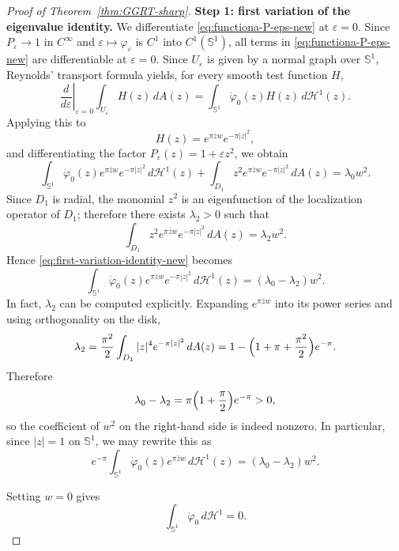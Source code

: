 \documentclass[a4paper,11pt,reqno]{amsart}
\numberwithin{equation}{section}
\theoremstyle{plain} %
\theoremstyle{definition} %
\theoremstyle{remark}
\begin{document}
\begin{proof}[Proof of Theorem~\ref{thm:GGRT-sharp}]
\medskip
\noindent
{\bf Step 1: first variation of the eigenvalue identity.} We differentiate \eqref{eq:functiona-P-eps-new} at $\varepsilon=0$.
Since \(P_\varepsilon\to 1\) in \(C^\infty\) and
\(\varepsilon\mapsto \varphi_\varepsilon\) is \(C^1\) into \(C^1(\mathbb S^1)\),
all terms in \eqref{eq:functiona-P-eps-new} are differentiable at
\(\varepsilon=0\). Since $U_\varepsilon$ is given by a normal graph over $\mathbb S^1$, Reynolds'
transport formula yields, for every smooth test function $H$,
\[
\left.\frac{d}{d\varepsilon}\right|_{\varepsilon=0}
\int_{U_\varepsilon} H(z)\,dA(z)
=
\int_{\mathbb S^1} \dot\varphi_0(z)H(z)\,d\mathcal H^1(z).
\]
Applying this to
\[
H(z)=e^{\pi \overline zw}e^{-\pi|z|^2},
\]
and differentiating the factor $P_\varepsilon(z)=1+\varepsilon z^2$, we obtain
\begin{equation}\label{eq:first-variation-identity-new}
\int_{\mathbb S^1}
\dot\varphi_0(z)e^{\pi \overline zw}e^{-\pi|z|^2}\,d\mathcal H^1(z)
+
\int_{D_1} z^2 e^{\pi \overline zw}e^{-\pi|z|^2}\,dA(z)
=
\lambda_0 w^2.
\end{equation}
Since $D_1$ is radial, the monomial $z^2$ is an eigenfunction of the
localization operator of $D_1$; therefore there exists $\lambda_2>0$ such that
\[
\int_{D_1} z^2 e^{\pi \overline zw}e^{-\pi|z|^2}\,dA(z)=\lambda_2 w^2.
\]
Hence \eqref{eq:first-variation-identity-new} becomes
\begin{equation}\label{eq:boundary-identity-new}
\int_{\mathbb S^1}
\dot\varphi_0(z)e^{\pi \overline zw}e^{-\pi|z|^2}\,d\mathcal H^1(z)
=
(\lambda_0-\lambda_2)w^2.
\end{equation}
In fact, \(\lambda_2\) can be computed explicitly. Expanding
\(e^{\pi \overline zw}\) into its power series and using orthogonality on the
disk,
\[
\lambda_2
=
\frac{\pi^2}{2}\int_{D_1}|z|^4e^{-\pi|z|^2}\,dA(z)
=
1-\Bigl(1+\pi+\frac{\pi^2}{2}\Bigr)e^{-\pi}.
\]
Therefore
\[
\lambda_0-\lambda_2
=
\pi\Bigl(1+\frac{\pi}{2}\Bigr)e^{-\pi}>0,
\]
so the coefficient of \(w^2\) on the right-hand side is indeed nonzero.
In particular, since $|z|=1$ on $\mathbb S^1$, we may rewrite this as
\begin{equation}\label{eq:boundary-identity-circle-new}
e^{-\pi}
\int_{\mathbb S^1}
\dot\varphi_0(z)e^{\pi \overline zw}\,d\mathcal H^1(z)
=
(\lambda_0-\lambda_2)w^2.
\end{equation}

Setting $w=0$ gives
\begin{equation}\label{eq:cancellation-f-0-new}
\int_{\mathbb S^1}\dot\varphi_0\,d\mathcal H^1=0.
\end{equation}


\end{proof}
\end{document}
